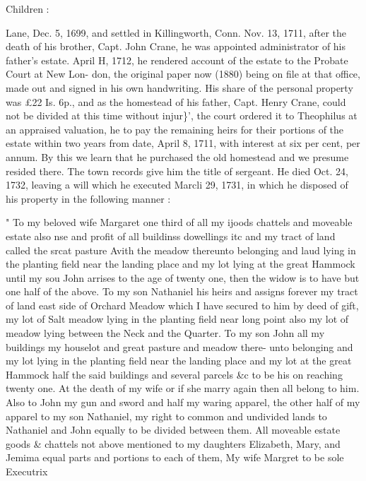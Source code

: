 \documentclass{book}
\begin{document}
Children : 










Lane, Dec. 5, 1699, and settled in Killingworth, Conn. Nov. 13, 
1711, after the death of his brother, Capt. John Crane, he was 
appointed administrator of his father's estate. April H, 1712, he 
rendered account of the estate to the Probate Court at New Lon- 
don, the original paper now (1880) being on file at that office, 
made out and signed in his own handwriting. His share of the 
personal property was £22  Is.  6p., and as the homestead of 
his father, Capt. Henry Crane, could not be divided at this time 
without injur\}', the court ordered it to Theophilus at an appraised 
valuation, he to pay the remaining heirs for their portions of the 
estate within two years from date, April 8, 1711, with interest at 
six per cent, per annum. By this we learn that he purchased the 
old homestead and we presume resided there. The town records 
give him the title of sergeant. He died Oct. 24, 1732, leaving a 
will which he executed Marcli 29, 1731, in which he disposed of 
his property in the following manner : 

" To my beloved wife Margaret one third of all my ijoods chattels and 
moveable estate also nse and profit of all buildinss dowellings itc and 
my tract of land called the srcat pasture Avith the meadow thereunto 
belonging and laud lying in the planting field near the landing place and 
my lot lying at the great Hammock until my sou John arrises to the age 
of twenty one, then the widow is to have but one half of the above. 
To my son Nathaniel his heirs and assigns forever my tract of land east 
side of Orchard Meadow which I have secured to him by deed of gift, 
my lot of Salt meadow lying in the planting field near long point also my 
lot of meadow lying between the Neck and the Quarter. To my son 
John all my buildings my houselot and great pasture and meadow there- 
unto belonging and my lot lying in the planting field near the landing 
place and my lot at the great Hammock half the said buildings and 
several parcels \&c to be his on reaching twenty one. At the death of my 
wife or if she marry again then all belong to him. Also to John my gun 
and sword and half my waring apparel, the other half of my apparel to 
my son Nathaniel, my right to common and undivided lands to Nathaniel 
and John equally to be divided between them. All moveable estate 
goods \& chattels not above mentioned to my daughters Elizabeth, Mary, 
and Jemima equal parts and portions to each of them, 
My wife Margret to be sole Executrix 
\end{document}
